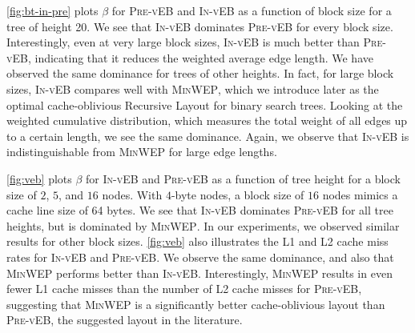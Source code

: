 \documentclass[10pt,conference,letterpaper]{IEEEtran}
\newcommand{\note}[1]{}
\newcommand{\nodes}{nodes\xspace}
\newcommand{\RL}{Recursive Layout\xspace}
\newcommand{\pvl}{\textsc{Pre-vEB}\xspace}
\newcommand{\ivl}{\textsc{In-vEB}\xspace}
\newcommand{\PB}{\ensuremath{\beta}\xspace}
\newcommand{\minwep}{\textsc{MinWEP}\xspace}
\begin{document}
\autoref{fig:bt-in-pre} plots \PB for \pvl and \ivl as a function of block size for a tree of height 20. We see that \ivl dominates \pvl for every block size. Interestingly, even at very large block sizes, \ivl is much better than \pvl, indicating that it reduces the weighted average edge length.  We have observed the same dominance for trees of other heights.
In fact, for large block sizes, \ivl compares well with \minwep, which we introduce later as the optimal cache-oblivious \RL for binary search trees. 
Looking at the weighted cumulative distribution, which measures the total weight of all edges up to a certain length, we see the same dominance. 
Again, we observe that \ivl is indistinguishable from \minwep for large edge lengths.

\note{Point out that similar results were observed for different block sizes and tree heights. Stated.}
\autoref{fig:veb} plots \PB for \ivl and \pvl as a function of tree height for a block size of $2$, $5$, and $16$ \nodes. With $4$-byte \nodes, a block size of $16$ \nodes mimics a cache line size of 64 bytes. We see that \ivl dominates \pvl for all tree heights, but is dominated by \minwep. 
In our experiments, we observed similar results for other block sizes. 
\autoref{fig:veb} also illustrates the L1 and L2 cache miss rates for \ivl and \pvl. We observe the same dominance, and also that \minwep performs better than \ivl. Interestingly, \minwep results in even fewer L1 cache misses than the number of L2 cache misses for \pvl, suggesting that \minwep is a significantly better cache-oblivious layout than \pvl, the suggested layout in the literature. 
\end{document}
